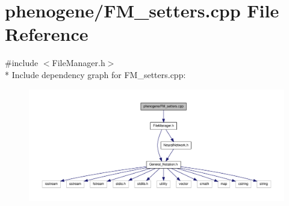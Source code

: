 \hypertarget{a00007}{\section{phenogene/\-F\-M\-\_\-setters.cpp File Reference}
\label{de/d5e/a00007}
}
{\ttfamily \#include $<$File\-Manager.\-h$>$}\\*
Include dependency graph for F\-M\-\_\-setters.\-cpp\-:\nopagebreak
\begin{figure}[H]
\begin{center}
\leavevmode
\includegraphics[width=350pt]{d6/d5b/a00026}
\end{center}
\end{figure}
